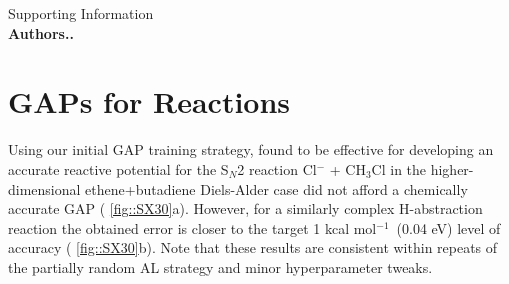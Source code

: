 \documentclass[11pt]{article}
\numberwithin{equation}{subsection}
\newcommand{\kcal}{kcal mol$^{-1}$}
\begin{document}
	
\begin{titlepage}
	\vspace*{\fill}
	\begin{center}
		{\huge Supporting Information}\\
		\vspace{0.2cm}
		{\large\bfseries{Authors..}}
	\end{center}
	\vspace*{\fill}

\end{titlepage}	
\newpage

\tableofcontents
\clearpage


\section{GAPs for Reactions}

Using our initial GAP training strategy,\cite{gaptrain2021} found to be effective for developing an accurate reactive potential for the S${}_N$2 reaction Cl${}^{-}$ + CH${}_3$Cl in the higher-dimensional ethene+butadiene Diels-Alder case did not afford a chemically accurate GAP (\figurename{ \ref{fig::SX30}a}). However, for a similarly complex H-abstraction reaction the obtained error is closer to the target 1 \kcal~(0.04 eV) level of accuracy (\figurename{ \ref{fig::SX30}b}). Note that these results are consistent within repeats of the partially random AL strategy and minor hyperparameter tweaks.
\end{document}
